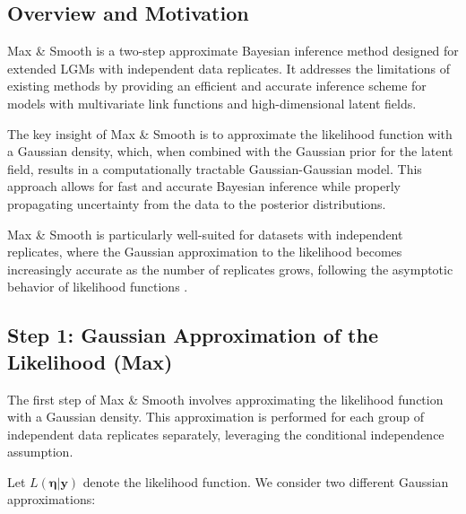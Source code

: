 
\subsection{Overview and Motivation} \label{subsec:ms-overview}
Max \& Smooth \citep{hrafnkelsson2021max} is a two-step approximate Bayesian inference method designed for extended LGMs with independent data replicates. It addresses the limitations of existing methods by providing an efficient and accurate inference scheme for models with multivariate link functions and high-dimensional latent fields.

The key insight of Max \& Smooth is to approximate the likelihood function with a Gaussian density, which, when combined with the Gaussian prior for the latent field, results in a computationally tractable Gaussian-Gaussian model. This approach allows for fast and accurate Bayesian inference while properly propagating uncertainty from the data to the posterior distributions.

Max \& Smooth is particularly well-suited for datasets with independent replicates, where the Gaussian approximation to the likelihood becomes increasingly accurate as the number of replicates grows, following the asymptotic behavior of likelihood functions \citep{schervish1995theory}.

\subsection{Step 1: Gaussian Approximation of the Likelihood (Max)} \label{subsec:ms-step1}
The first step of Max \& Smooth involves approximating the likelihood function with a Gaussian density. This approximation is performed for each group of independent data replicates separately, leveraging the conditional independence assumption.

Let $L(\boldsymbol{\eta}|\mathbf{y})$ denote the likelihood function. We consider two different Gaussian approximations:

